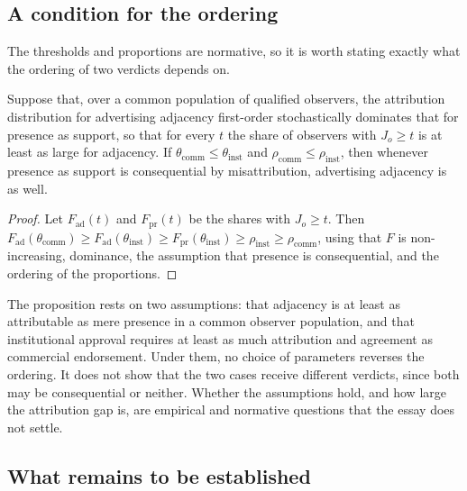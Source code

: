 \subsection{A condition for the ordering}

The thresholds and proportions are normative, so it is worth stating exactly what the ordering of two verdicts depends on.

\begin{proposition}
Suppose that, over a common population of qualified observers, the attribution distribution for advertising adjacency first-order stochastically dominates that for presence as support, so that for every $t$ the share of observers with $J_o\ge t$ is at least as large for adjacency. If $\theta_{\text{comm}}\le\theta_{\text{inst}}$ and $\rho_{\text{comm}}\le\rho_{\text{inst}}$, then whenever presence as support is consequential by misattribution, advertising adjacency is as well.
\end{proposition}

\begin{proof}
Let $F_{\text{ad}}(t)$ and $F_{\text{pr}}(t)$ be the shares with $J_o\ge t$. Then
$F_{\text{ad}}(\theta_{\text{comm}})\ge F_{\text{ad}}(\theta_{\text{inst}})\ge F_{\text{pr}}(\theta_{\text{inst}})\ge\rho_{\text{inst}}\ge\rho_{\text{comm}}$,
using that $F$ is non-increasing, dominance, the assumption that presence is consequential, and the ordering of the proportions.
\end{proof}

The proposition rests on two assumptions: that adjacency is at least as attributable as mere presence in a common observer population, and that institutional approval requires at least as much attribution and agreement as commercial endorsement. Under them, no choice of parameters reverses the ordering. It does not show that the two cases receive different verdicts, since both may be consequential or neither. Whether the assumptions hold, and how large the attribution gap is, are empirical and normative questions that the essay does not settle.

\subsection{What remains to be established}

